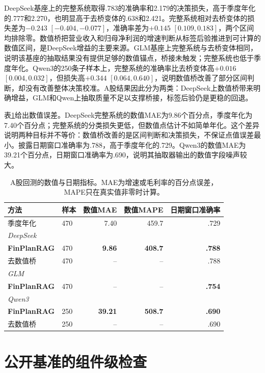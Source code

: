 DeepSeek基座上的完整系统取得.783的准确率和2.179的决策损失，高于季度年化的.777和2.270，也明显高于去桥变体的.638和2.421。完整系统相对去桥变体的损失差为$-0.243$ $[-0.404,-0.077]$，准确率差为$+0.145$ $[0.109,0.183]$，两个区间均排除零。数值桥把营业收入和归母净利润的增速判断从标签后验推进到可计算的数值区间，是DeepSeek增益的主要来源。GLM基座上完整系统与去桥变体相同，说明该基座的抽取结果没有提供足够的数值锚点，桥接未触发；完整系统也低于季度年化。Qwen3的250条子样本上，完整系统的准确率比去桥变体高$+0.016$ $[0.004,0.032]$，但损失高$+0.344$ $[0.064,0.640]$，说明数值桥改善了部分区间判断，却没有改善整体决策校准。A股结果因此分为两类：DeepSeek上数值桥带来明确增益，GLM和Qwen上抽取质量不足以支撑桥接，标签后验仍是更稳的回退。

表\ref{tab:ashare-numeric}给出数值误差。DeepSeek完整系统的数值MAE为9.86个百分点，季度年化为7.40个百分点；完整系统的分类损失更低，但数值点估计不如简单年化。这个差异说明两种目标并不等价：数值桥改善的是区间判断和决策损失，不保证点值误差最小。披露日期窗口准确率为.788，高于季度年化的.729。Qwen3的数值MAE为39.21个百分点，日期窗口准确率为.690，说明其抽取器输出的数值字段噪声较大。

\begin{table}[H]
\centering
{}
\setlength{\tabcolsep}{4pt}
\caption{A股回测的数值与日期指标。MAE为增速或毛利率的百分点误差，MAPE只在真实值非零时计算。}
\label{tab:ashare-numeric}
\begin{tabular}{llrrr}
\toprule
方法 & 样本 & 数值MAE & 数值MAPE & 日期窗口准确率 \\
\midrule
季度年化 & 470 & 7.40 & 459.7 & .729 \\
\midrule
\multicolumn{5}{l}{\textit{DeepSeek}} \\
\textbf{FinPlanRAG} & 470 & \textbf{9.86} & \textbf{408.7} & \textbf{.788} \\
去数值桥 & 470 & -- & -- & .788 \\
\midrule
\multicolumn{5}{l}{\textit{GLM}} \\
\textbf{FinPlanRAG} & 470 & -- & -- & \textbf{.754} \\
\midrule
\multicolumn{5}{l}{\textit{Qwen3}} \\
\textbf{FinPlanRAG} & 250 & \textbf{39.21} & \textbf{508.7} & \textbf{.690} \\
去数值桥 & 250 & -- & -- & .690 \\
\bottomrule
\end{tabular}
\end{table}

\section{公开基准的组件级检查}

